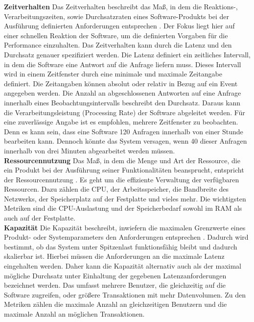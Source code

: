 \noindent
\textbf{Zeitverhalten}\newline
Das Zeitverhalten beschreibt das Maß, in dem die Reaktions-, Verarbeitungszeiten, sowie Durchsatzraten eines Software-Produkts bei der Ausführung definierten Anforderungen entsprechen \cite{ISOIEC.}. Der Fokus liegt hier auf einer schnellen Reaktion der Software, um die definierten Vorgaben für die Performance einzuhalten. Das Zeitverhalten kann durch die Latenz und den Durchsatz genauer spezifiziert werden. Die Latenz definiert ein zeitliches Intervall, in dem die Software eine Antwort auf die Anfrage liefern muss. Dieses Intervall wird in einem Zeitfenster durch eine minimale und maximale Zeitangabe definiert. Die Zeitangaben können absolut oder relativ in Bezug auf ein Event angegeben werden. Die Anzahl an abgeschlossenen Antworten auf eine Anfrage innerhalb eines Beobachtungsintervalls beschreibt den Durchsatz. Daraus kann die Verarbeitungsleistung (Processing Rate) der Software abgeleitet werden. Für eine zuverlässige Angabe ist es empfohlen, mehrere Zeitfenster zu beobachten. Denn es kann sein, dass eine Software 120 Anfragen innerhalb von einer Stunde bearbeiten kann. Dennoch könnte das System versagen, wenn 40 dieser Anfragen innerhalb von drei Minuten abgearbeitet werden müssen.\cite{Barbacci.1995}\\

\noindent
\textbf{Ressourcennutzung}\newline
Das Maß, in dem die Menge und Art der Ressource, die ein Produkt bei der Ausführung seiner Funktionalitäten beansprucht, entspricht der Ressourcennutzung \cite{ISOIEC.}. Es geht um die effiziente Verwaltung der verfügbaren Ressourcen. Dazu zählen die CPU, der Arbeitsspeicher, die Bandbreite des Netzwerks, der Speicherplatz auf der Festplatte und vieles mehr. Die wichtigsten Metriken sind die CPU-Auslastung und der Speicherbedarf sowohl im RAM als auch auf der Festplatte.\cite{Barbacci.1995}\\

\noindent
\textbf{Kapazität}\newline
Die Kapazität beschreibt, inwiefern die maximalen Grenzwerte eines Produkt- oder Systemparameters den Anforderungen entsprechen \cite{ISOIEC.}. Dadurch wird bestimmt, ob das System unter Spitzenlast funktionsfähig bleibt und dadurch skalierbar ist. Hierbei müssen die Anforderungen an die maximale Latenz eingehalten werden. Daher kann die Kapazität alternativ auch als der maximal mögliche Durchsatz unter Einhaltung der gegebenen Latenzanforderungen bezeichnet werden. Das umfasst mehrere Benutzer, die gleichzeitig auf die Software zugreifen, oder größere Transaktionen mit mehr Datenvolumen. Zu den Metriken zählen die maximale Anzahl an gleichzeitigen Benutzern und die maximale Anzahl an möglichen Transaktionen.\cite{Barbacci.1995}